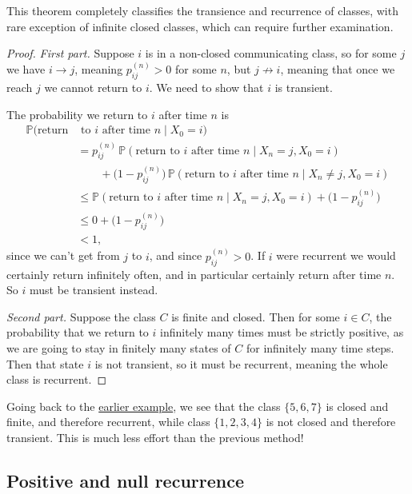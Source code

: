 \documentclass[
  a4paper,
]{article}
\theoremstyle{definition}
\theoremstyle{definition}
\theoremstyle{definition}
\theoremstyle{remark}
\begin{document}
This theorem completely classifies the transience and recurrence of classes, with rare exception of infinite closed classes, which can require further examination.

\begin{proof}

\emph{First part.} Suppose \(i\) is in a non-closed communicating class, so for some \(j\) we have \(i \to j\), meaning \(p_{ij}^{(n)} > 0\) for some \(n\), but \(j \not\to i\), meaning that once we reach \(j\) we cannot return to \(i\). We need to show that \(i\) is transient.

The probability we return to \(i\) after time \(n\) is
\begin{align*}
\mathbb P(\text{return} & \text{ to } i \text{ after time $n$} \mid X_0 = i) \\
&= p_{ij}^{(n)}\,\mathbb P(\text{return to $i$ after time $n$} \mid X_n = j, X_0 = i) \\
&\qquad {}+ \big(1 - p_{ij}^{(n)}\big)\,\mathbb P(\text{return to $i$ after time $n$} \mid X_n \neq j, X_0 = i) \\
&\leq \mathbb P(\text{return to $i$ after time $n$} \mid X_n = j, X_0 = i) +  \big(1 - p_{ij}^{(n)}\big) \\
&\leq 0 + \big(1 - p_{ij}^{(n)}\big) \\
&< 1,
\end{align*}
since we can't get from \(j\) to \(i\), and since \(p_{ij}^{(n)} > 0\). If \(i\) were recurrent we would certainly return infinitely often, and in particular certainly return after time \(n\). So \(i\) must be transient instead.

\emph{Second part.} Suppose the class \(C\) is finite and closed. Then for some \(i \in C\), the probability that we return to \(i\) infinitely many times must be strictly positive, as we are going to stay in finitely many states of \(C\) for infinitely many time steps. Then that state \(i\) is not transient, so it must be recurrent, meaning the whole class is recurrent.

\end{proof}

Going back to the \protect\hyperlink{exm:rec}{earlier example}, we see that the class \(\{5,6,7\}\) is closed and finite, and therefore recurrent, while class \(\{1,2,3,4\}\) is not closed and therefore transient. This is much less effort than the previous method!

\hypertarget{S09-positive-null}{%
\subsection{Positive and null recurrence}\label{S09-positive-null}}
\end{document}
